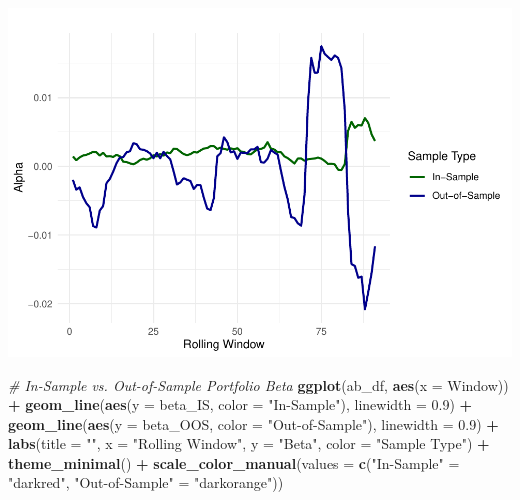\documentclass[
  12pt,
]{article}
\newenvironment{Shaded}{\begin{snugshade}}{\end{snugshade}}
\newcommand{\AttributeTok}[1]{\textcolor[rgb]{0.13,0.29,0.53}{#1}}
\newcommand{\CommentTok}[1]{\textcolor[rgb]{0.56,0.35,0.01}{\textit{#1}}}
\newcommand{\FloatTok}[1]{\textcolor[rgb]{0.00,0.00,0.81}{#1}}
\newcommand{\FunctionTok}[1]{\textcolor[rgb]{0.13,0.29,0.53}{\textbf{#1}}}
\newcommand{\NormalTok}[1]{#1}
\newcommand{\OtherTok}[1]{\textcolor[rgb]{0.56,0.35,0.01}{#1}}
\newcommand{\SpecialCharTok}[1]{\textcolor[rgb]{0.81,0.36,0.00}{\textbf{#1}}}
\newcommand{\StringTok}[1]{\textcolor[rgb]{0.31,0.60,0.02}{#1}}
\begin{document}
\includegraphics{NDXNES005_A2_RMD_files/figure-latex/unnamed-chunk-9-1.pdf}

\begin{Shaded}
\begin{Highlighting}[]
\CommentTok{\# In{-}Sample vs. Out{-}of{-}Sample Portfolio Beta}
\FunctionTok{ggplot}\NormalTok{(ab\_df, }\FunctionTok{aes}\NormalTok{(}\AttributeTok{x =}\NormalTok{ Window)) }\SpecialCharTok{+}
  \FunctionTok{geom\_line}\NormalTok{(}\FunctionTok{aes}\NormalTok{(}\AttributeTok{y =}\NormalTok{ beta\_IS, }\AttributeTok{color =} \StringTok{"In{-}Sample"}\NormalTok{), }\AttributeTok{linewidth =} \FloatTok{0.9}\NormalTok{) }\SpecialCharTok{+}
  \FunctionTok{geom\_line}\NormalTok{(}\FunctionTok{aes}\NormalTok{(}\AttributeTok{y =}\NormalTok{ beta\_OOS, }\AttributeTok{color =} \StringTok{"Out{-}of{-}Sample"}\NormalTok{), }\AttributeTok{linewidth =} \FloatTok{0.9}\NormalTok{) }\SpecialCharTok{+}
  \FunctionTok{labs}\NormalTok{(}\AttributeTok{title =} \StringTok{""}\NormalTok{,}
       \AttributeTok{x =} \StringTok{"Rolling Window"}\NormalTok{, }\AttributeTok{y =} \StringTok{"Beta"}\NormalTok{, }\AttributeTok{color =} \StringTok{"Sample Type"}\NormalTok{) }\SpecialCharTok{+}
  \FunctionTok{theme\_minimal}\NormalTok{() }\SpecialCharTok{+}
  \FunctionTok{scale\_color\_manual}\NormalTok{(}\AttributeTok{values =} \FunctionTok{c}\NormalTok{(}\StringTok{"In{-}Sample"} \OtherTok{=} \StringTok{"darkred"}\NormalTok{, }\StringTok{"Out{-}of{-}Sample"} \OtherTok{=} \StringTok{"darkorange"}\NormalTok{))}
\end{Highlighting}
\end{Shaded}
\end{document}
